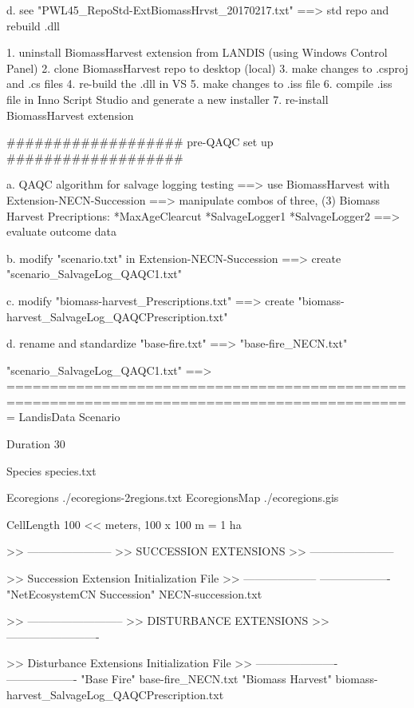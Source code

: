 	d. see "PWL45_RepoStd-ExtBiomassHrvst_20170217.txt"
		==> std repo and rebuild .dll

1. uninstall BiomassHarvest extension from LANDIS (using Windows Control Panel)
2. clone BiomassHarvest repo to desktop (local)
3. make changes to .csproj and .cs files
4. re-build the .dll in VS 
5. make changes to .iss file 
6. compile .iss file in Inno Script Studio and generate a new installer
7. re-install BiomassHarvest extension






###################
pre-QAQC set up
###################


	a. QAQC algorithm for salvage logging testing
		==> use BiomassHarvest with Extension-NECN-Succession
		==> manipulate combos of three, (3) Biomass Harvest Precriptions:
			*MaxAgeClearcut
			*SalvageLogger1
			*SalvageLogger2
		==> evaluate outcome data

	b. modify "scenario.txt" in Extension-NECN-Succession
		==> create "scenario_SalvageLog_QAQC1.txt"

	c. modify "biomass-harvest_Prescriptions.txt"
		==> create "biomass-harvest_SalvageLog_QAQCPrescription.txt"

	d. rename and standardize "base-fire.txt"
		==> "base-fire_NECN.txt"


"scenario_SalvageLog_QAQC1.txt" ==>
=============================================================================================
LandisData  Scenario

Duration  30

Species   species.txt

Ecoregions      ./ecoregions-2regions.txt
EcoregionsMap   ./ecoregions.gis

CellLength  100 << meters, 100 x 100 m = 1 ha



>> -----------------------
>> SUCCESSION EXTENSIONS
>> -----------------------

>> 	Succession Extension     	Initialization File
>> 	--------------------     	-------------------
   	"NetEcosystemCN Succession"	NECN-succession.txt


>> --------------------------
>> DISTURBANCE EXTENSIONS
>> -------------------------

>> 	Disturbance Extensions   	Initialization File
>>	 ----------------------   	-------------------
	"Base Fire"			base-fire_NECN.txt
	"Biomass Harvest"		biomass-harvest_SalvageLog_QAQCPrescription.txt


